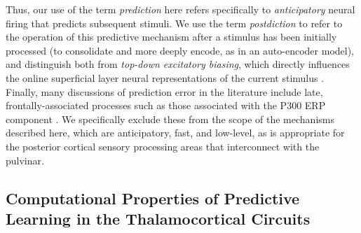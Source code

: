\documentclass[11pt,twoside]{article}
\newif\myifpdf
\begin{document}
Thus, our use of the term \emph{prediction} here refers specifically to \emph{anticipatory} neural firing that predicts subsequent stimuli.  We use the term \emph{postdiction} to refer to the operation of this predictive mechanism after a stimulus has been initially processed (to consolidate and more deeply encode, as in an auto-encoder model), and distinguish both from \emph{top-down excitatory biasing}, which directly influences the online superficial layer neural representations of the current stimulus \citep{DesimoneDuncan95,ReynoldsChelazziDesimone99,MillerCohen01,OReillyWyatteHerdEtAl13}.  Finally, many discussions of prediction error in the literature include late, frontally-associated processes such as those associated with the P300 ERP component \citep{HolroydColes02}.  We specifically exclude these from the scope of the mechanisms described here, which are anticipatory, fast, and low-level, as is appropriate for the posterior cortical sensory processing areas that interconnect with the pulvinar.

\subsection{Computational Properties of Predictive Learning in the Thalamocortical Circuits}
\end{document}
